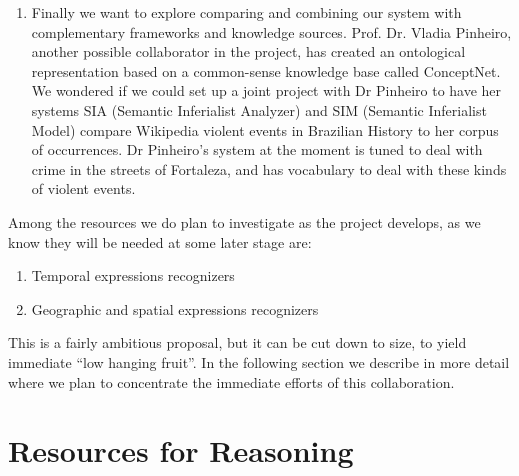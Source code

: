 \begin{enumerate}
\item Finally we want to explore comparing and combining our system
  with complementary frameworks and knowledge sources.
  Prof. Dr. Vladia Pinheiro, another possible collaborator in the
  project, has created an ontological representation based on a
  common-sense knowledge base called ConceptNet. We wondered if we
  could set up a joint project with Dr Pinheiro to have her systems
  SIA (Semantic Inferialist Analyzer) and SIM (Semantic Inferialist
  Model) compare Wikipedia violent events in Brazilian History to her
  corpus of occurrences.  Dr Pinheiro's system at the moment is tuned
  to deal with crime in the streets of Fortaleza, and has vocabulary
  to deal with these kinds of violent events.
\end{enumerate}

Among the resources we do plan to investigate as the project develops,
as we know they will be needed at some later stage are:

\begin{enumerate}
\item Temporal expressions recognizers
\item Geographic and spatial expressions recognizers
\end{enumerate}

This is a fairly ambitious proposal, but it can be cut down to size,
to yield immediate ``low hanging fruit''. In the following section we
describe in more detail where we plan to concentrate the immediate
efforts of this collaboration.


\section{Resources for Reasoning}

